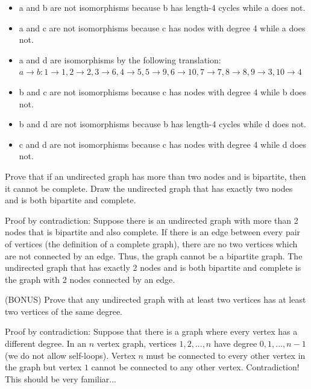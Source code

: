 \documentclass[solution, letterpaper]{cs20inclass}
\begin{document}
\begin{solution}
\begin{itemize}
\item[] a and b are not isomorphisms because b has length-4 cycles while a does not.
\item[] a and c are not isomorphisms because c has nodes with degree 4 while a does not.
\item[] a and d are isomorphisms by the following translation: $a \rightarrow b: 1 \rightarrow 1, 2 \rightarrow 2, 3 \rightarrow 6, 4 \rightarrow 5, 5 \rightarrow 9, 6 \rightarrow 10, 7 \rightarrow 7, 8 \rightarrow 8, 9 \rightarrow 3, 10 \rightarrow 4$
\item[] b and c are not isomorphisms because c has nodes with degree 4 while b does not.
\item[] b and d are not isomorphisms because b has length-4 cycles while d does not.
\item[] c and d are not isomorphisms because c has nodes with degree 4 while d does not.
\end{itemize}
\end{solution}

\problem Prove that if an undirected graph has more than two nodes and is bipartite, then it cannot be complete. Draw the undirected graph that has exactly two nodes and is both bipartite and complete.

\begin{solution} Proof by contradiction: Suppose there is an undirected graph with more than 2 nodes that is bipartite and also complete. If there is an edge between every pair of vertices (the definition of a complete graph), there are no two vertices which are not connected by an edge. Thus, the graph cannot be a bipartite graph. The undirected graph that has exactly 2 nodes and is both bipartite and complete is the graph with 2 nodes connected by an edge.
\end{solution}

\problem (BONUS) Prove that any undirected graph with at least two vertices has at least two vertices of the same degree.

\begin{solution} Proof by contradiction: Suppose that there is a graph where every vertex has a different degree. In an $n$ vertex graph, vertices $1, 2, ..., n$ have degree $0, 1, ..., n-1$ (we do not allow self-loops). Vertex $n$ must be connected to every other vertex in the graph but vertex $1$ cannot be connected to any other vertex. Contradiction! This should be very familiar...
\end{solution}
\end{document}

